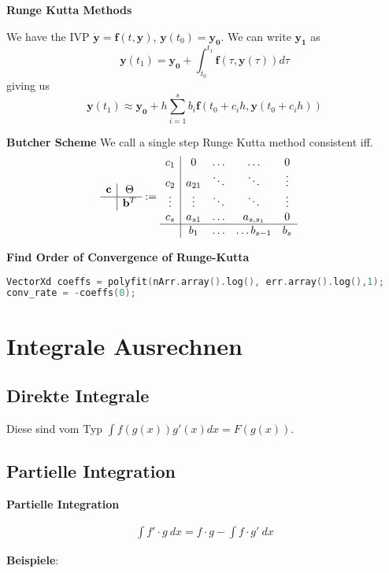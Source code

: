 \documentclass{sciposter}
\renewcommand{\vec}[1]{\mathbf{#1}}
\newenvironment{method}[1]{\begin{mdframed}[backgroundcolor=blue!10,innertopmargin=15pt, innerbottommargin=15pt, nobreak=true]
		\textbf{#1 }
	}
	{ 
	\end{mdframed}
}
\newcommand{\psection}[1]{\par \textbf{\large#1}}
\begin{document}
\begin{multicols}{2}
\psection{Runge Kutta Methods}

We have the IVP  $\dot{\vec{y}} = \vec{f}(t,\vec{y})$, $\vec{y}(t_0) = \vec{y_0}$. We can write $\vec{y_1}$ as $$\vec{y}(t_1) = \vec{y_0} + \int_{t_0}^{t_1} \vec{f}(\tau, \vec{y}(\tau)) d\tau $$
giving us
$$
\vec{y}(t_1) \approx \vec{y_0} + h\sum_{i=1}^{s} b_i \vec{f}(t_0 + c_i h , \vec{y}(t_0 + c_i h))
$$

\psection{Butcher Scheme}
We call a single step Runge Kutta method consistent iff. 
\begin{align*}
	\begin{array}
	{c|ccccc}
	\vec{c} &  \Theta \\
	\hline
	& \vec{b}^T
	\end{array} &:= 
	\begin{array}{c|cccc}
	c_1 &  0 & \ldots & \ldots & 0  \\
	c_2 &  a_{21} & \ddots &\ddots & \vdots\\
	\vdots & \vdots& \ddots & \ddots & \vdots \\
	c_s & a_{s1} & \ldots & a_{s,s_1} & 0\\
	\hline
	& b_1 &\ldots & \ldots b_{s-1} & b_s
	\end{array} 
\end{align*}

\psection{Find Order of Convergence of Runge-Kutta}
\begin{lstlisting}[language=c++]
VectorXd coeffs = polyfit(nArr.array().log(), err.array().log(),1); 
conv_rate = -coeffs(0);
\end{lstlisting}





\section*{Integrale Ausrechnen}


\subsection*{Direkte Integrale}
Diese sind vom Typ $\int f(g(x)) g'(x) dx = F(g(x))$.

\subsection*{Partielle Integration}
\begin{method}{Partielle Integration}
	\begin{align*}
	\int f' \cdot g \ dx = f \cdot g - \int f \cdot g' \  dx
	\end{align*}
\end{method}
\textbf{Beispiele}:



\end{multicols}
\end{document}
